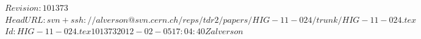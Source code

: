 \documentclass[12pt,twoside,a4paper,cmspaper,final,collab]{cms-tdr}
\begin{document}



\RCS$Revision: 101373 $
\RCS$HeadURL: svn+ssh://alverson@svn.cern.ch/reps/tdr2/papers/HIG-11-024/trunk/HIG-11-024.tex $
\RCS$Id: HIG-11-024.tex 101373 2012-02-05 17:04:40Z alverson $
\newlength\cmsFigWidth\setlength{}



\newcommand{\Hi}{\PH}
\newcommand{\W}{\PW}
\newcommand{\Wjets}{\ensuremath{\PW+\mathrm{jets}}}
\newcommand{\Zjets}{\ensuremath{\cPZ+\mathrm{jets}}}
\newcommand{\WW}{\PWp{}\PWm}
\newcommand{\ZZ}{\ensuremath{\cPZ\cPZ}}
\newcommand{\WZ}{\ensuremath{\PW\cPZ}}
\newcommand{\El}{\Pe}
\newcommand{\Elp}{\Pep}
\newcommand{\Elm}{\Pem}
\newcommand{\Elpm}{\ensuremath{\Pe^{\pm}}}
\newcommand{\Elmp}{\ensuremath{\Pe^{\mp}}}
\newcommand{\M}{\Pgm}
\newcommand{\Mp}{\Pgmp}
\newcommand{\Mm}{\Pgmm}
\newcommand{\Mmp}{\ensuremath{\Pgm^{\mp}}}
\newcommand{\Tau}{\Pgt}
\newcommand{\Nu}{\cPgn}
\newcommand{\Nubar}{\cPagn}
\newcommand{\Lep}{\ensuremath{\mathrm{\ell}}}
\newcommand{\Lepp}{\ensuremath{\mathrm{\ell}^{+}}}
\newcommand{\Lepm}{\ensuremath{\mathrm{\ell}^{-}}}
\newcommand{\Lprime}{\ensuremath{\Lep^{\prime}}}
\newcommand{\PP}{\Pp{}\Pp}
\newcommand{\PPbar}{\Pp{}\Pap}
\newcommand{\qq}{\Pq{}\Pq}
\newcommand{\To}{\ensuremath{\rightarrow}}

\newcommand{\mHi}{\ensuremath{m_{\PH}}}
\newcommand{\mW}{\ensuremath{m_{\PW}}}
\newcommand{\mZ}{\ensuremath{m_{\cPZ}}}
\newcommand{\mll}{\ensuremath{m_{\Lep\Lep}}}

\newcommand{\ptveto}{\ensuremath{\pt^\text{veto}}}
\newcommand{\ptl}{\ensuremath{p_\perp^{\Lep}}}
\newcommand{\ptlmax}{\ensuremath{\pt^{\Lep,\mathrm{max}}}}
\newcommand{\ptlmin}{\ensuremath{\pt^{\Lep,\mathrm{min}}}}
\newcommand{\met}{\MET}
\newcommand{\delphill}{\ensuremath{\Delta\phi_{\Lep\Lep}}}
\newcommand{\deletall}{\ensuremath{\Delta\eta_{\Lep\Lep}}}
\newcommand{\delphimetl}{\ensuremath{\Delta\phi_{\met\Lep}}}
\newcommand{\delphimetll}{\ensuremath{\Delta\phi_{\met\Lep\Lep}}}
\newcommand{\Et}{\ET}
\newcommand{\delR}{\ensuremath{\Delta R}}
\newcommand{\Eta}{\ensuremath{\eta}}
\newcommand{\GAMMA}{\Pgg}

\newcommand{\effsig}{\ensuremath{\varepsilon_{\text{bkg}}^{\mathrm{S}}}}
\newcommand{\effnorm}{\ensuremath{\varepsilon_{\text{bkg}}^{\mathrm{N}}}}
\newcommand{\Nsig}{\ensuremath{N_{\text{bkg}}^{\mathrm{S}}}}
\newcommand{\Nnorm}{\ensuremath{N_{\text{bkg}}^{\mathrm{N}}}}
\end{document}

